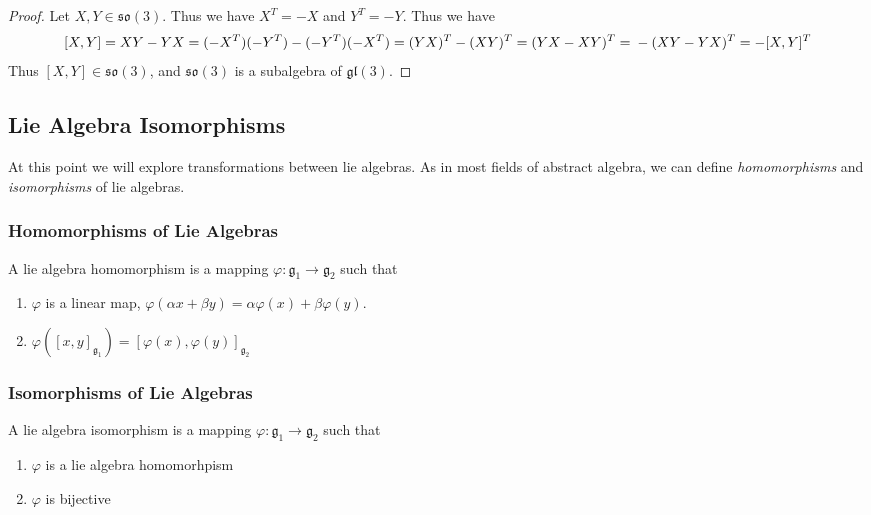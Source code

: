 \documentclass[a4paper]{article}
\begin{document}
\begin{proof}
  Let $X,Y \in \mathfrak{so}(3)$. Thus we have $X^T = -X$ and $Y^T = -Y$. Thus we have
  \[
    [X,Y] = XY - YX = (-X^T)(-Y^T) - (-Y^T)(-X^T) = (YX)^T - (XY)^T = (YX - XY)^T = \\
    -(XY - YX)^T = -[X,Y]^T
  \]
  Thus $[X,Y] \in \mathfrak{so}(3)$, and $\mathfrak{so}(3)$ is a subalgebra of $\mathfrak{gl}(3)$.
\end{proof}

\subsection*{Lie Algebra Isomorphisms}
At this point we will explore transformations between lie algebras. As in most fields of abstract algebra, we can define \textit{homomorphisms} and \textit{isomorphisms} of lie algebras.

\subsubsection*{Homomorphisms of Lie Algebras}

A lie algebra homomorphism is a mapping $\varphi: \mathfrak{g}_1 \rightarrow \mathfrak{g}_2$ such that
\begin{enumerate}
  \item $\varphi$ is a linear map, $\varphi(\alpha x + \beta y) = \alpha \varphi(x) + \beta \varphi(y)$.
  \item $\varphi([x,y]_{\mathfrak{g}_1}) = [\varphi(x), \varphi(y)]_{\mathfrak{g}_2}$
\end{enumerate}

\subsubsection*{Isomorphisms of Lie Algebras}
A lie algebra isomorphism is a mapping $\varphi: \mathfrak{g}_1 \rightarrow \mathfrak{g}_2$ such that
\begin{enumerate}
  \item $\varphi$ is a lie algebra homomorhpism
  \item $\varphi$ is bijective
\end{enumerate}
\end{document}
